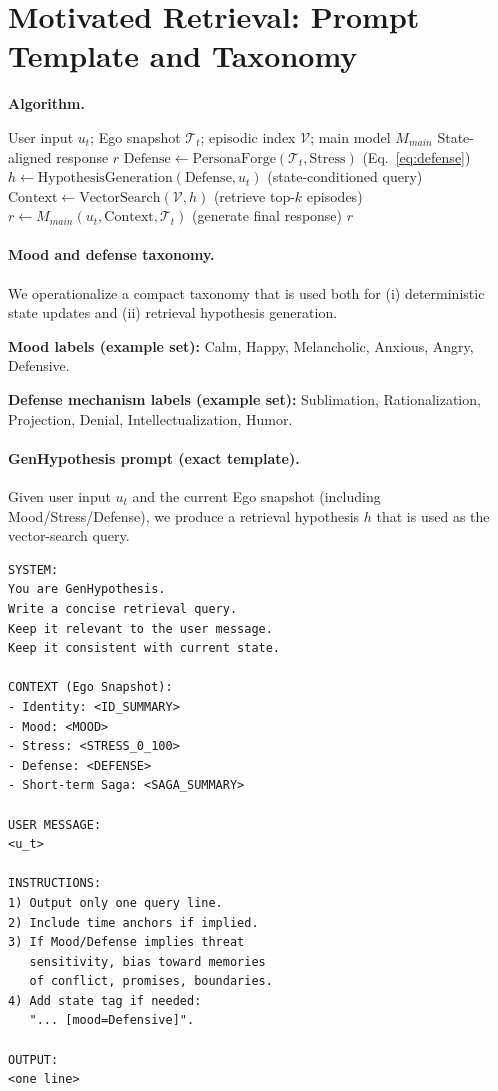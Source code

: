 \documentclass[11pt]{article}
\begin{document}
\section{Motivated Retrieval: Prompt Template and Taxonomy}
\label{app:motivated-retrieval}

\noindent\textbf{Algorithm.}
\begin{algorithm}[t]
\caption{State-Dependent Query Expansion (System~2)}
\label{alg:motivated-retrieval}
\begin{algorithmic}[1]
\REQUIRE User input $u_t$; Ego snapshot $\mathcal{T}_t$; episodic index $\mathcal{V}$; main model $M_{main}$
\ENSURE State-aligned response $r$
\STATE $\text{Defense} \leftarrow \text{PersonaForge}(\mathcal{T}_t, \text{Stress})$ \hfill (Eq.~\ref{eq:defense})
\STATE $h \leftarrow \text{HypothesisGeneration}(\text{Defense}, u_t)$ \hfill (state-conditioned query)
\STATE $\text{Context} \leftarrow \text{VectorSearch}(\mathcal{V}, h)$ \hfill (retrieve top-$k$ episodes)
\STATE $r \leftarrow M_{main}(u_t, \text{Context}, \mathcal{T}_t)$ \hfill (generate final response)
\RETURN $r$
\end{algorithmic}
\end{algorithm}

\paragraph{Mood and defense taxonomy.}
We operationalize a compact taxonomy that is used both for (i) deterministic state updates and (ii) retrieval hypothesis generation.

\textbf{Mood labels (example set):} Calm, Happy, Melancholic, Anxious, Angry, Defensive.

\textbf{Defense mechanism labels (example set):} Sublimation, Rationalization, Projection, Denial, Intellectualization, Humor.

\paragraph{GenHypothesis prompt (exact template).}
Given user input $u_t$ and the current Ego snapshot (including Mood/Stress/Defense), we produce a retrieval hypothesis $h$ that is used as the vector-search query.

\begin{Verbatim}[fontsize=\footnotesize]
SYSTEM:
You are GenHypothesis.
Write a concise retrieval query.
Keep it relevant to the user message.
Keep it consistent with current state.

CONTEXT (Ego Snapshot):
- Identity: <ID_SUMMARY>
- Mood: <MOOD>
- Stress: <STRESS_0_100>
- Defense: <DEFENSE>
- Short-term Saga: <SAGA_SUMMARY>

USER MESSAGE:
<u_t>

INSTRUCTIONS:
1) Output only one query line.
2) Include time anchors if implied.
3) If Mood/Defense implies threat
   sensitivity, bias toward memories
   of conflict, promises, boundaries.
4) Add state tag if needed:
   "... [mood=Defensive]".

OUTPUT:
<one line>
\end{Verbatim}
\end{document}
